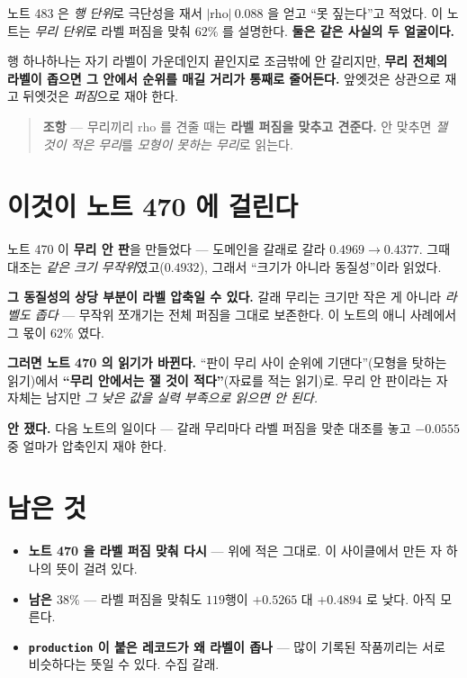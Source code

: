 \documentclass[11pt]{article}
\begin{document}
노트 483 은 \emph{행 단위}로 극단성을 재서 $|$rho$|\ 0.088$ 을 얻고
``못 짚는다''고 적었다. 이 노트는 \emph{무리 단위}로 라벨 퍼짐을 맞춰
$62\%$ 를 설명한다. \textbf{둘은 같은 사실의 두 얼굴이다.}

행 하나하나는 자기 라벨이 가운데인지 끝인지로 조금밖에 안 갈리지만,
\textbf{무리 전체의 라벨이 좁으면 그 안에서 순위를 매길 거리가 통째로
줄어든다.} 앞엣것은 상관으로 재고 뒤엣것은 \emph{퍼짐}으로 재야 한다.

\begin{quote}
\textbf{조항} --- 무리끼리 rho 를 견줄 때는 \textbf{라벨 퍼짐을 맞추고
견준다.} 안 맞추면 \emph{잴 것이 적은 무리}를 \emph{모형이 못하는 무리}로
읽는다.
\end{quote}

\section{이것이 노트 470 에 걸린다}

노트 470 이 \textbf{무리 안 판}을 만들었다 --- 도메인을 갈래로 갈라
$0.4969 \to 0.4377$. 그때 대조는 \emph{같은 크기 무작위}였고($0.4932$),
그래서 ``크기가 아니라 동질성''이라 읽었다.

\textbf{그 동질성의 상당 부분이 라벨 압축일 수 있다.} 갈래 무리는 크기만
작은 게 아니라 \emph{라벨도 좁다} --- 무작위 쪼개기는 전체 퍼짐을 그대로
보존한다. 이 노트의 애니 사례에서 그 몫이 $62\%$ 였다.

\textbf{그러면 노트 470 의 읽기가 바뀐다.} ``판이 무리 사이 순위에
기댄다''(모형을 탓하는 읽기)에서 \textbf{``무리 안에서는 잴 것이
적다''}(자료를 적는 읽기)로. 무리 안 판이라는 자 자체는 남지만
\emph{그 낮은 값을 실력 부족으로 읽으면 안 된다.}

\textbf{안 쟀다.} 다음 노트의 일이다 --- 갈래 무리마다 라벨 퍼짐을
맞춘 대조를 놓고 $-0.0555$ 중 얼마가 압축인지 재야 한다.

\section*{남은 것}

\begin{itemize}
\item \textbf{노트 470 을 라벨 퍼짐 맞춰 다시} --- 위에 적은 그대로.
이 사이클에서 만든 자 하나의 뜻이 걸려 있다.
\item \textbf{남은 $38\%$} --- 라벨 퍼짐을 맞춰도 $119$행이 $+0.5265$
대 $+0.4894$ 로 낮다. 아직 모른다.
\item \textbf{\texttt{production} 이 붙은 레코드가 왜 라벨이 좁나} ---
많이 기록된 작품끼리는 서로 비슷하다는 뜻일 수 있다. 수집 갈래.
\end{itemize}
\end{document}
